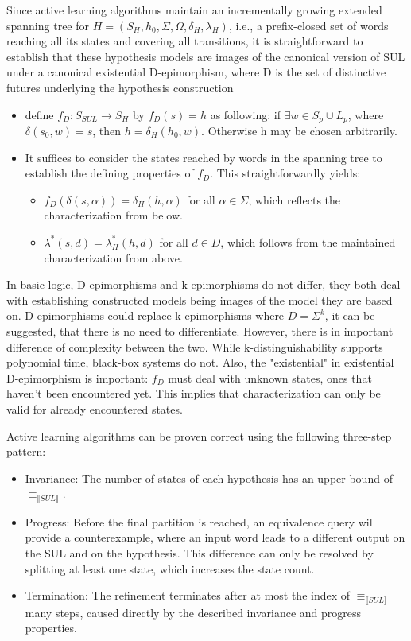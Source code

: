 Since active learning algorithms maintain an incrementally growing extended spanning tree for $H=(S_H, h_0, \Sigma, \Omega, \delta_H, \lambda_H)$, i.e., a prefix-closed set of words reaching all its states and covering all transitions, it is straightforward to establish that these hypothesis models are images of the canonical version of SUL under a canonical existential D-epimorphism, where D is the set of distinctive futures underlying the hypothesis construction\cite{Steffen2011}
\begin{itemize}
	\item define $f_D : S_{SUL}\to S_H$ by $f_D(s) = h$ as following: if $\exists w\in S_p \cup L_p$, where $\delta(s_0, w) = s$, then $h = \delta_H(h_0,w)$. Otherwise h may be chosen arbitrarily.
	\item It suffices to consider the states reached by words in the spanning tree to establish the defining properties of $f_D$. This straightforwardly yields:
	\begin{itemize}
		\item $f_D(\delta(s,\alpha)) = \delta_H(h, \alpha)$ for all $\alpha\in\Sigma$, which reflects the characterization from below.
		\item $\lambda^*(s, d) = \lambda^*_H(h,d)$ for all $d\in D$, which follows from the maintained characterization from above.\cite{Steffen2011}
	\end{itemize}
\end{itemize}

In basic logic, D-epimorphisms and k-epimorphisms do not differ, they both deal with establishing constructed models being images of the model they are based on. D-epimorphisms could replace k-epimorphisms where $D=\Sigma^k$, it can be suggested, that there is no need to differentiate. However, there is in important difference of complexity between the two. While k-distinguishability supports polynomial time, black-box systems do not. Also, the "existential" in existential D-epimorphism is important: $f_D$ must deal with unknown states, ones that haven't been encountered yet. This implies that characterization can only be valid for already encountered states.

Active learning algorithms can be proven correct using the following three-step pattern:
\begin{itemize}
	\item Invariance: The number of states of each hypothesis has an upper bound of $\equiv_{\llbracket SUL\rrbracket}$.
	\item Progress: Before the final partition is reached, an equivalence query will provide a counterexample, where an input word leads to a different output on the SUL and on the hypothesis. This difference can only be resolved by splitting at least one state, which increases the state count.
	\item Termination: The refinement terminates after at most the index of $\equiv_{\llbracket SUL\rrbracket}$ many steps, caused directly by the described invariance and progress properties.
\end{itemize}

